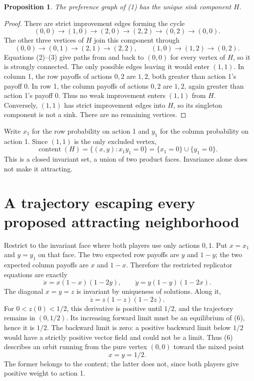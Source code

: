 \documentclass[11pt]{article}
\newtheorem{proposition}{Proposition}
\begin{document}
\begin{proposition}
The preference graph of (1) has the unique sink component $H$.
\end{proposition}
\begin{proof}
There are strict improvement edges forming the cycle
\[
 (0,0)\longrightarrow(1,0)\longrightarrow(2,0)
 \longrightarrow(2,2)\longrightarrow(0,2)
 \longrightarrow(0,0).
 \tag{2}
\]
The other three vertices of $H$ join this component through
\[
 (0,0)\longrightarrow(0,1)\longrightarrow(2,1)
 \longrightarrow(2,2),\qquad
 (1,0)\longrightarrow(1,2)\longrightarrow(0,2).
 \tag{3}
\]
Equations (2)--(3) give paths from and back to $(0,0)$ for every vertex
of $H$, so it is strongly connected. The only possible edges leaving
it would enter $(1,1)$. In column 1, the row payoffs of actions $0,2$
are $1,2$, both greater than action 1's payoff $0$. In row 1, the
column payoffs of actions $0,2$ are $1,2$, again greater than action
1's payoff $0$. Thus no weak improvement enters $(1,1)$ from $H$.
Conversely, $(1,1)$ has strict improvement edges into $H$, so its
singleton component is not a sink. There are no remaining vertices.
\end{proof}

Write $x_1$ for the row probability on action 1 and $y_1$ for the column
probability on action 1. Since $(1,1)$ is the only excluded vertex,
\[
 \operatorname{content}(H)
 =\{(x,y):x_1y_1=0\}
 =\{x_1=0\}\cup\{y_1=0\}.
 \tag{4}
\]
This is a closed invariant set, a union of two product faces. Invariance
alone does not make it attracting.

\section*{A trajectory escaping every proposed attracting neighborhood}
Restrict to the invariant face where both players use only actions
$0,1$. Put $x=x_1$ and $y=y_1$ on that face. The two expected row payoffs
are $y$ and $1-y$; the two expected column payoffs are $x$ and $1-x$.
Therefore the restricted replicator equations are exactly
\[
 \dot x=x(1-x)(1-2y),\qquad
 \dot y=y(1-y)(1-2x).
 \tag{5}
\]
The diagonal $x=y=z$ is invariant by uniqueness of solutions. Along it,
\[
 \dot z=z(1-z)(1-2z).
 \tag{6}
\]
For $0<z(0)<1/2$, this derivative is positive until $1/2$, and the
trajectory remains in $(0,1/2)$. Its increasing forward limit must be
an equilibrium of (6), hence it is $1/2$. The backward limit is zero:
a positive backward limit below $1/2$ would have a strictly positive
vector field and could not be a limit. Thus (6) describes an orbit
running from the pure vertex $(0,0)$ toward the mixed point
\[
 x=y=1/2.
\]
The former belongs to the content; the latter does not, since both
players give positive weight to action 1.
\end{document}
